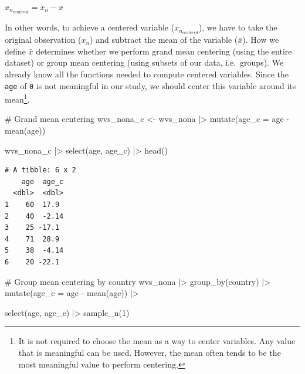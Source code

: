 \documentclass[
  letterpaper,
  DIV=11,
  numbers=noendperiod]{scrreprt}
\newenvironment{Shaded}{\begin{snugshade}}{\end{snugshade}}
\newcommand{\AttributeTok}[1]{\textcolor[rgb]{0.40,0.45,0.13}{#1}}
\newcommand{\CommentTok}[1]{\textcolor[rgb]{0.37,0.37,0.37}{#1}}
\newcommand{\DecValTok}[1]{\textcolor[rgb]{0.68,0.00,0.00}{#1}}
\newcommand{\FunctionTok}[1]{\textcolor[rgb]{0.28,0.35,0.67}{#1}}
\newcommand{\NormalTok}[1]{\textcolor[rgb]{0.00,0.23,0.31}{#1}}
\newcommand{\OtherTok}[1]{\textcolor[rgb]{0.00,0.23,0.31}{#1}}
\newcommand{\SpecialCharTok}[1]{\textcolor[rgb]{0.37,0.37,0.37}{#1}}
\begin{document}
\label{centering-formula}
\(x_{n_{centered}} = x_n - \overline{x}\)

In other words, to achieve a centered variable (\(x_{n_{centered}}\)),
we have to take the original observation (\(x_n\)) and subtract the mean
of the variable (\(\bar{x}\)). How we define \(\bar{x}\) determines
whether we perform grand mean centering (using the entire dataset) or
group mean centering (using subsets of our data, i.e.~groups). We
already know all the functions needed to compute centered variables.
Since the \texttt{age} of \texttt{0} is not meaningful in our study, we
should center this variable around its mean\footnote{It is not required
  to choose the mean as a way to center variables. Any value that is
  meaningful can be used. However, the mean often tends to be the most
  meaningful value to perform centering.}.

\begin{Shaded}
\begin{Highlighting}[]
\CommentTok{\# Grand mean centering}
\NormalTok{wvs\_nona\_c }\OtherTok{\textless{}{-}}
\NormalTok{  wvs\_nona }\SpecialCharTok{|\textgreater{}}
  \FunctionTok{mutate}\NormalTok{(}\AttributeTok{age\_c =}\NormalTok{ age }\SpecialCharTok{{-}} \FunctionTok{mean}\NormalTok{(age))}

\NormalTok{wvs\_nona\_c }\SpecialCharTok{|\textgreater{}}
  \FunctionTok{select}\NormalTok{(age, age\_c) }\SpecialCharTok{|\textgreater{}}
  \FunctionTok{head}\NormalTok{()}
\end{Highlighting}
\end{Shaded}

\begin{verbatim}
# A tibble: 6 x 2
    age  age_c
  <dbl>  <dbl>
1    60  17.9 
2    40  -2.14
3    25 -17.1 
4    71  28.9 
5    38  -4.14
6    20 -22.1 
\end{verbatim}

\begin{Shaded}
\begin{Highlighting}[]
\CommentTok{\# Group mean centering by country}
\NormalTok{wvs\_nona }\SpecialCharTok{|\textgreater{}}
  \FunctionTok{group\_by}\NormalTok{(country) }\SpecialCharTok{|\textgreater{}}
  \FunctionTok{mutate}\NormalTok{(}\AttributeTok{age\_c =}\NormalTok{ age }\SpecialCharTok{{-}} \FunctionTok{mean}\NormalTok{(age)) }\SpecialCharTok{|\textgreater{}}
  
  \FunctionTok{select}\NormalTok{(age, age\_c) }\SpecialCharTok{|\textgreater{}}
  \FunctionTok{sample\_n}\NormalTok{(}\DecValTok{1}\NormalTok{)}
\end{Highlighting}
\end{Shaded}
\end{document}

